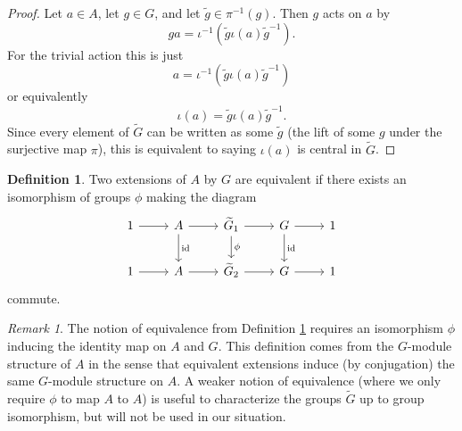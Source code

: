 \documentclass{dcthesis}
\newcommand{\defi}[1]{\textsf{#1}}
\newcommand{\wt}[1]{\widetilde{#1}}
\DeclareMathOperator{\id}{id}
\numberwithin{equation}{section}
\theoremstyle{definition}
\newtheorem{definition}[equation]{Definition}
\theoremstyle{remark}
\newtheorem{remark}[equation]{Remark}
\begin{document}
{{\begin{proof}
      Let $a\in A$, let $g\in G$,
      and let $\wt{g}\in\pi^{-1}(g)$.
      Then $g$ acts on $a$ by
      \begin{equation}
        \label{eqn:gaction}
        ga=\iota^{-1}\left(\wt{g}\iota(a){\wt{g}}^{-1}\right).
      \end{equation}
      For the trivial action this is just
      \begin{equation}
        \label{eqn:gactiontrivial1}
        a=\iota^{-1}\left(\wt{g}\iota(a)\wt{g}^{-1}\right)
      \end{equation}
      or equivalently
      \begin{equation}
        \label{eqn:gactiontrivial2}
        \iota(a)=\wt{g}\iota(a)\wt{g}^{-1}.
      \end{equation}
      Since every element of $\wt{G}$ can be written as some
      $\wt{g}$ (the lift of some $g$ under the surjective map $\pi$),
      this is equivalent to saying $\iota(a)$
      is central in $\wt{G}$.
    \end{proof}
    \begin{definition}
      \label{def:equivalentgroupextension}
      Two extensions of $A$ by $G$ are
      \defi{equivalent}
      if there exists an isomorphism of groups
      $\phi$ making the diagram
      \begin{equation}
        \label{eqn:twoextensions}
        \begin{tikzcd}
          1\arrow{r}&A\arrow{d}{\id}\arrow{r}{}&\wt{G}_1\arrow{r}{}\arrow{d}{\phi}&G\arrow{d}{\id}\arrow{r}&1\\
          1\arrow{r}&A\arrow{r}{}&\wt{G}_2\arrow{r}{}&G\arrow{r}&1
        \end{tikzcd}
      \end{equation}
      commute.
    \end{definition}
    \begin{remark}
      \label{rmk:otherequivalences}
      The notion of equivalence from
      Definition \ref{def:equivalentgroupextension}
      requires an isomorphism $\phi$
      inducing the identity map on $A$ and $G$.
      This definition comes from the $G$-module structure of $A$
      in the sense that equivalent extensions
      induce (by conjugation) the same $G$-module structure on $A$.
      A weaker notion of equivalence
      (where we only require $\phi$
      to map $A$ to $A$)
      is useful to characterize
      the groups $\wt{G}$ up to group isomorphism,
      but will not be used in our situation.
    \end{remark}
}}
\end{document}
